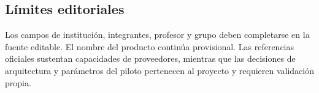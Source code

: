 
\subsection*{Límites editoriales}
Los campos de institución, integrantes, profesor y grupo deben completarse en la fuente editable. El nombre del producto continúa provisional. Las referencias oficiales sustentan capacidades de proveedores, mientras que las decisiones de arquitectura y parámetros del piloto pertenecen al proyecto y requieren validación propia.
